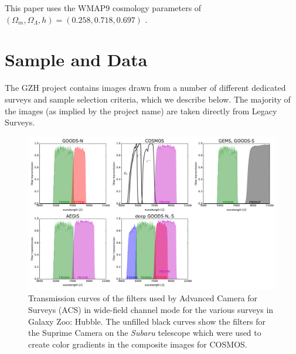 \documentclass[twocolumn]{aastex6}
\begin{document}
This paper uses the WMAP9 cosmology parameters of $(\Omega_m,\Omega_\Lambda,h)=(0.258,0.718,0.697)$ \citep{hin13}.


\section{Sample and Data}\label{sec:data}

The GZH project contains images drawn from a number of different dedicated surveys and sample selection criteria, which we describe below. The majority of the images (as implied by the project name) are taken directly from \hst{} Legacy Surveys.

\begin{figure}
\includegraphics[width=160mm]{figures/filter_curves.pdf}
\caption{Transmission curves of the filters used by \hst{} Advanced Camera for Surveys (ACS) in wide-field channel mode for the various surveys in Galaxy Zoo: Hubble. The unfilled black curves show the filters for the Suprime Camera on the \textit{Subaru} telescope which were used to create color gradients in the composite images for COSMOS.\label{fig:filtercurves}}
\end{figure}
\end{document}
